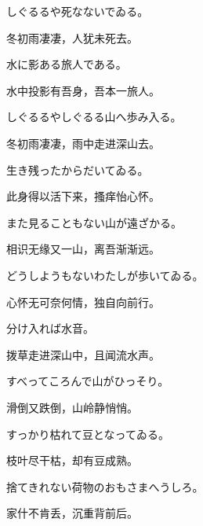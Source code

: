 \begin{haiku}
    {\FH しぐるるや死なないでゐる。}

    {\FK 冬初雨凄凄，人犹未死去。}
\end{haiku}

\begin{haiku}
    {\FH 水に影ある旅人である。}

    {\FK 水中投影有吾身，吾本一旅人。}
\end{haiku}

\begin{haiku}
    {\FH しぐるるやしぐるる山へ歩み入る。}

    {\FK 冬初雨凄凄，雨中走进深山去。}
\end{haiku}

\begin{haiku}
    {\FH 生き残ったからだいてゐる。}

    {\FK 此身得以活下来，搔痒怡心怀。}
\end{haiku}

\begin{haiku}
    {\FH また見ることもない山が遠ざかる。}

    {\FK 相识无缘又一山，离吾渐渐远。}
\end{haiku}

\begin{haiku}
    {\FH どうしようもないわたしが歩いてゐる。}

    {\FK 心怀无可奈何情，独自向前行。}
\end{haiku}

\begin{haiku}
    {\FH 分け入れば水音。}

    {\FK 拨草走进深山中，且闻流水声。}
\end{haiku}

\begin{haiku}
    {\FH すべってころんで山がひっそり。}

    {\FK 滑倒又跌倒，山岭静悄悄。}
\end{haiku}

\begin{haiku}
    {\FH すっかり枯れて豆となってゐる。}

    {\FK 枝叶尽干枯，却有豆成熟。}
\end{haiku}

\begin{haiku}
    {\FH 捨てきれない荷物のおもさまへうしろ。}

    {\FK 家什不肯丢，沉重背前后。}
\end{haiku}

